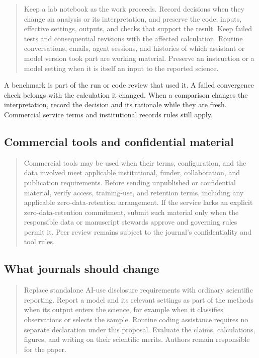 \documentclass[11pt]{article}
\begin{document}
\begin{quote}
Keep a lab notebook as the work proceeds. Record decisions when they
change an analysis or its interpretation, and preserve the code, inputs,
effective settings, outputs, and checks that support the result. Keep
failed tests and consequential revisions with the affected calculation.
Routine conversations, emails, agent sessions, and histories of which
assistant or model version took part are working material. Preserve an
instruction or a model setting when it is itself an input to the
reported science.
\end{quote}

A benchmark is part of the run or code review that used it. A failed
convergence check belongs with the calculation it changed. When a
comparison changes the interpretation, record the decision and its
rationale while they are fresh. Commercial service terms and
institutional records rules still apply.

\subsection{Commercial tools and confidential
material}\label{commercial-tools-and-confidential-material}

\begin{quote}
Commercial tools may be used when their terms, configuration, and the
data involved meet applicable institutional, funder, collaboration, and
publication requirements. Before sending unpublished or confidential
material, verify access, training-use, and retention terms, including
any applicable zero-data-retention arrangement. If the service lacks an
explicit zero-data-retention commitment, submit such material only when
the responsible data or manuscript stewards approve and governing rules
permit it. Peer review remains subject to the journal's confidentiality
and tool rules.
\end{quote}

\clearpage

\subsection{What journals should
change}\label{what-journals-should-change}

\begin{quote}
Replace standalone AI-use disclosure requirements with ordinary
scientific reporting. Report a model and its relevant settings as part
of the methods when its output enters the science, for example when it
classifies observations or selects the sample. Routine coding assistance
requires no separate declaration under this proposal. Evaluate the
claims, calculations, figures, and writing on their scientific merits.
Authors remain responsible for the paper.
\end{quote}
\end{document}
